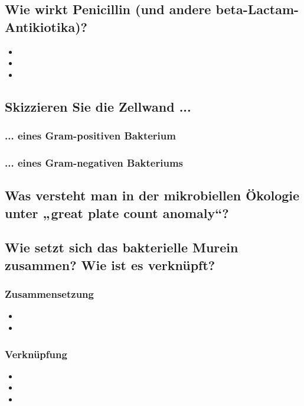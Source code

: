 \documentclass{article}
\begin{document}
\subsection*{Wie wirkt Penicillin (und andere beta-Lactam-Antikiotika)?}
\begin{itemize}
    \item 
    \item 
    \item 
\end{itemize}
\subsection*{Skizzieren Sie die Zellwand ...}
\subsubsection*{... eines Gram-positiven Bakterium}
\bigskip\bigskip\bigskip\bigskip\bigskip\bigskip
\subsubsection*{... eines Gram-negativen Bakteriums}
\bigskip\bigskip\bigskip\bigskip\bigskip\bigskip

\subsection*{Was versteht man
in der mikrobiellen Ökologie unter „great plate
count anomaly“?}
\bigskip\bigskip\bigskip\bigskip\bigskip\bigskip
\subsection*{Wie setzt sich das bakterielle Murein
zusammen? Wie ist es verknüpft?}
\subsubsection{Zusammensetzung}
\begin{itemize}
    \item 
    \item 
\end{itemize}
\subsubsection{Verknüpfung}
\begin{itemize}
    \item 
    \item 
    \item
\end{itemize}
\end{document}
